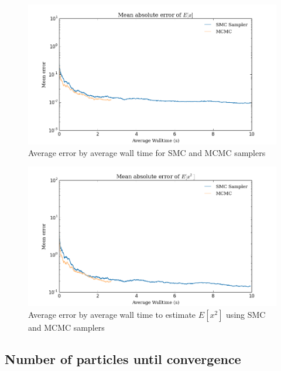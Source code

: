 \documentclass[12pt]{elsarticle}
\begin{document}
\begin{figure}[htbp]
\begin{center}
\includegraphics[width = \textwidth]{plots/E_X_walltime.png}
\caption{Average error by average wall time for SMC and MCMC samplers}
\label{walltime_ex}
\end{center}
\end{figure}

\begin{figure}[htbp]
\begin{center}
\includegraphics[width = \textwidth]{plots/E_X2_walltime.png}
\caption{Average error by average wall time to estimate $E[x^2]$ using SMC and MCMC samplers}
\label{walltime_ex2}
\end{center}
\end{figure}

\subsection*{Number of particles until convergence }
\end{document}
